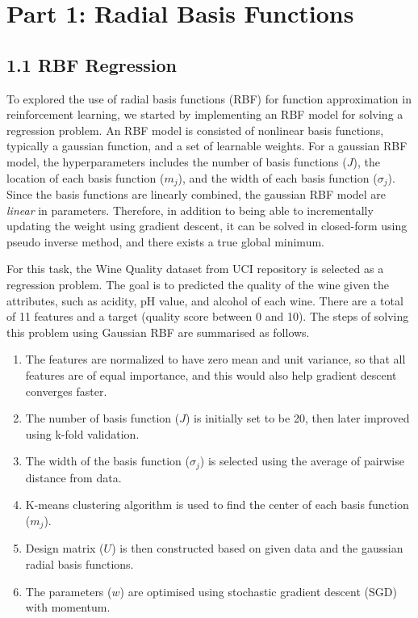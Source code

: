 \documentclass[12pt,letterpaper]{article}
\newenvironment{myitemize}
{ \begin{enumerate}
    \setlength{\itemsep}{1pt}
    \setlength{\parskip}{1pt}
    \setlength{\parsep}{1pt}     }
{ \end{enumerate}         }
\begin{document}
\section*{Part 1: Radial Basis Functions}

\subsection*{1.1 RBF Regression}
To explored the use of radial basis functions (RBF) for function approximation in reinforcement learning,
we started by implementing an RBF model for solving a regression problem. 
An RBF model is consisted of nonlinear basis functions, typically a gaussian function, and a set of learnable weights. 
For a gaussian RBF model, the hyperparameters includes the number of basis functions ($J$), the location of each basis function ($m_j$), 
and the width of each basis function ($\sigma_j$). 
Since the basis functions are linearly combined, the gaussian RBF model are \textit{linear} in parameters. 
Therefore, in addition to being able to incrementally updating the weight using gradient descent, 
it can be solved in closed-form using pseudo inverse method, and there exists a true global minimum.

For this task, the Wine Quality dataset from UCI repository is selected as a regression problem. 
The goal is to predicted the quality of the wine given the attributes, such as acidity, pH value, and alcohol of each wine. 
There are a total of 11 features and a target (quality score between 0 and 10). 
The steps of solving this problem using Gaussian RBF are summarised as follows.
\begin{myitemize}
    \item The features are normalized to have zero mean and unit variance, 
    so that all features are of equal importance, and this would also help gradient descent converges faster.
    \item The number of basis function ($J$) is initially set to be 20, then later improved using k-fold validation.
    \item The width of the basis function ($\sigma_j$) is selected using the average of pairwise distance from data.
    \item K-means clustering algorithm is used to find the center of each basis function ($m_j$).
    \item Design matrix ($U$) is then constructed based on given data and the gaussian radial basis functions.
    \item The parameters ($w$) are optimised using stochastic gradient descent (SGD) with momentum.
\end{myitemize}    
\end{document}

